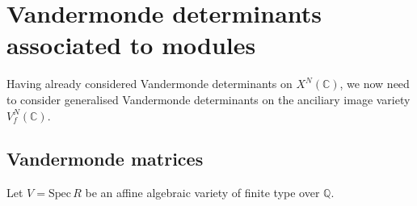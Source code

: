 \documentclass[a4paper,10pt]{amsart}
\theoremstyle{definition}
\theoremstyle{remark}
\numberwithin{equation}{section}
\newcommand{\Z}{\mathbb Z}
\newcommand{\Q}{\mathbb Q}
\newcommand{\C}{\mathbb C}
\newcommand{\0}{\color{blue}{\mathsf{0}}}
\begin{document}


  
  \section{Vandermonde determinants associated to modules} \label{sect: VdMModules}

 Having  already considered    Vandermonde determinants on $X^N(\C)$,  we now need to  consider generalised Vandermonde determinants on the anciliary image variety $V^N_f(\C)$.    
  \subsection{Vandermonde matrices}  \label{subsect: GenVdM} Let $V= \mathrm{Spec} \, R$ be an affine algebraic variety of finite type  over $\Q$.
   
\end{document}
